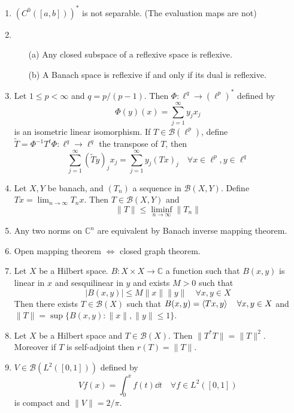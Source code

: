 \documentclass{article}
\theoremstyle{definition}
\newcommand{\B}{\mathcal B}
\newcommand{\CC}{\mathbb C}
\newcommand{\Lra}{\Leftrightarrow}
\begin{document}
\begin{enumerate}
	\item $(C^0([a, b]))^*$ is not separable. (The evaluation maps are not)

	\item 
		\begin{enumerate}
			\item[(a)] Any closed subspace of a reflexive space is reflexive.

			\item[(b)] A Banach space is reflexive if and only if its dual is reflexive.
		\end{enumerate}

	\item Let $1 \leq p < \infty$ and $q = p/(p - 1)$. 
		Then $\Phi: \ell^q \to (\ell^p)^*$ defined by
		\[
			\Phi(y)(x) = \sum_{j = 1}^\infty y_j x_j
		\]
		is an isometric linear isomorphism.
		If $T \in \B(\ell^p)$, define $\tilde{T} = \Phi^{-1} T^t \Phi: \ell^q \to \ell^q$ the transpose of $T$, then
		\[
			\sum_{j = 1}^\infty (\tilde{T} y)_j x_j = \sum_{j = 1}^\infty y_j (Tx)_j \quad \forall x \in \ell^p, y \in \ell^q
		\]

	\item Let $X, Y$ be banach, and $(T_n)$ a sequence in $\B(X, Y)$.
		Define $T x = \lim_{n \to \infty} T_n x$.
		Then $T \in \B(X, Y)$ and 
		\[
			\|T\| \leq \liminf_{n \to \infty} \|T_n\|
		\]

	\item Any two norms on $\CC^n$ are equivalent by Banach inverse mapping theorem.

	\item Open mapping theorem $\Lra$ closed graph theorem.

	\item Let $X$ be a Hilbert space.
		$B: X \times X \to \CC$ a function such that $B(x, y)$ is linear in $x$ and sesquilinear in $y$ and exists $M > 0$ such that
		\[
			|B(x, y)| \leq M\|x\| \|y\| \quad \forall x, y \in X
		\]
		Then there exists $T \in \B(X)$ such that $B(x, y) = \ev{T x, y} \quad \forall x, y \in X$ and $\|T\| = \sup\{B(x, y): \|x\|, \|y\| \leq 1\}$.

	\item Let $X$ be a Hilbert space and $T \in \B(X)$.
		Then $\|T^*T\| = \|T\|^2$.
		Moreover if $T$ is self-adjoint then $r(T) = \|T\|$.

	\item $V \in \B(L^2([0, 1]))$ defined by
		\[
			V f(x) = \int_0^x f(t) \dd{t} \quad \forall f \in L^2([0, 1])
		\]
		is compact and $\|V\| = 2/\pi$.


\end{enumerate}
\end{document}

